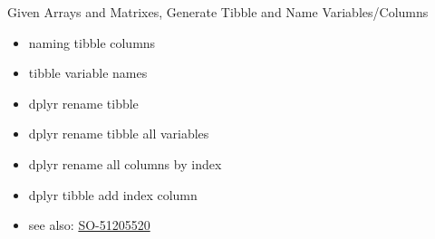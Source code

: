 \documentclass[
]{book}
\providecommand{\tightlist}{%
  \setlength{\itemsep}{0pt}\setlength{\parskip}{0pt}}
\begin{document}
Given Arrays and Matrixes, Generate Tibble and Name Variables/Columns

\begin{itemize}
\tightlist
\item
  naming tibble columns
\item
  tibble variable names
\item
  dplyr rename tibble
\item
  dplyr rename tibble all variables
\item
  dplyr rename all columns by index
\item
  dplyr tibble add index column
\item
  see also: \href{https://stackoverflow.com/questions/45535157/difference-between-dplyrrename-and-dplyrrename-all}{SO-51205520}
\end{itemize}
\end{document}
